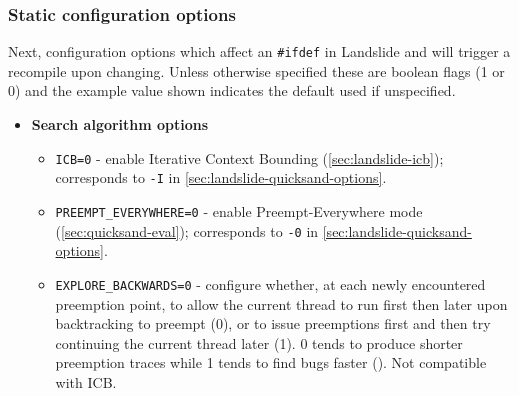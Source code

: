 \subsubsection{Static configuration options}
\label{sec:landslide-staticconfig}

Next, configuration options which affect an {\tt \#ifdef} in Landslide and will trigger a recompile upon changing.
Unless otherwise specified these are boolean flags (1 or 0) and the example value shown indicates the default used if unspecified.

\begin{itemize}
\item {\bf Search algorithm options}
\begin{itemize}
	\item {\tt ICB=0} - enable Iterative Context Bounding (\cref{sec:landslide-icb});
		corresponds to {\tt -I} in \cref{sec:landslide-quicksand-options}.
	\item {\tt PREEMPT\_EVERYWHERE=0} - enable Preempt-Everywhere mode (\cref{sec:quicksand-eval});
		corresponds to {\tt -0} in \cref{sec:landslide-quicksand-options}.
	\item {\tt EXPLORE\_BACKWARDS=0} - configure whether, at each newly encountered preemption point,
		to allow the current thread to run first then later upon backtracking to preempt (0),
		or to issue preemptions first and then try continuing the current thread later (1).
		0 tends to produce shorter preemption traces while 1 tends to find bugs faster (\cite[\S{}8.7.1]{landslide}).
		Not compatible with ICB.
\end{itemize}


\end{itemize}
